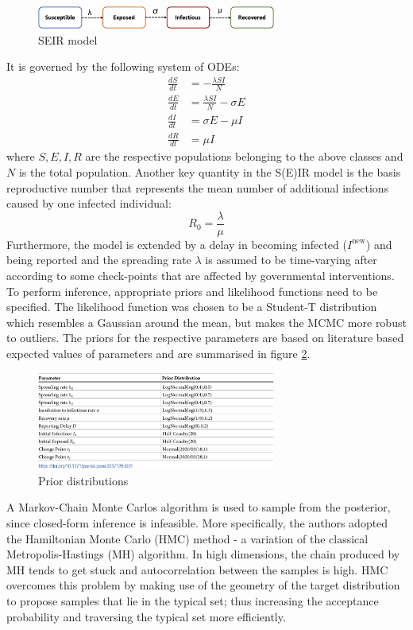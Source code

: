 \begin{figure}[h]
	\centering
	\includegraphics[width = 0.7\textwidth]{V1}
	\caption{SEIR model \cite{Bayes}}
	\label{V1}
\end{figure}
\noindent It is governed by the following system of ODEs:
\begin{align}
	\frac{dS}{dt} & = - \frac{\lambda S I }{N} \\
	\frac{dE}{dt} & = \frac{\lambda SI }{N} - \sigma E \\
	\frac{dI}{dt} & = \sigma E - \mu I \\
	\frac{dR}{dt} & = \mu I
\end{align}
where $S,E,I,R$ are the respective populations belonging to the above classes and $N$ is the total population. Another key quantity in the S(E)IR model is the basis reproductive number that represents the mean number of additional infections caused by one infected individual:
\begin{equation}
R_0 = \frac{\lambda}{\mu}
\end{equation}
Furthermore, the model is extended by a delay in becoming infected ($I^\text{new}$) and being reported and the spreading rate $\lambda$ is assumed to be time-varying after according to some check-points that are affected by governmental interventions.
\newline \newline
To perform inference, appropriate priors and likelihood functions need to be specified. The likelihood function was chosen to be a Student-T distribution which resembles a Gaussian around the mean, but makes the MCMC more robust to outliers. The priors for the respective parameters are based on literature based expected values of parameters and are summarised in figure \ref{V2}.
\begin{figure}[h]
	\centering
	\includegraphics[width = 0.7\textwidth]{V2}
	\caption{Prior distributions \cite{Bayes}}
	\label{V2}
\end{figure}
A Markov-Chain Monte Carlos algorithm is used to sample from the posterior, since closed-form inference is infeasible. More specifically, the authors adopted the Hamiltonian Monte Carlo (HMC) method - a variation of the classical Metropolis-Hastings (MH) algorithm. In high dimensions, the chain produced by MH tends to get stuck and autocorrelation between the samples is high. HMC overcomes this problem by making use of the geometry of the target distribution to propose samples that lie in the typical set; thus increasing the acceptance probability and traversing the typical set more efficiently. 

